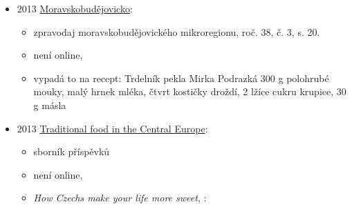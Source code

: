 \begin{itemize}
\begin{itemize}
    \begin{itemize}
    \tightlist
    \item
      s. 204 - obrázek kolíků na přípravu trdelníků a hotovejch
      smaženejch trdelníků z Rebešovic u Brna z roku 1972
    \item
      s. 205 - masopust, všeobecně se pekly koblížky, boží milosti a
      trdelníky, ve Vlčnově připravovali trdláče, pecové vdolky
    \item
      s. 216-217 - popis některejch variant trdelníků:

      \begin{itemize}
      \tightlist
      \item
        Dětkovice u Prostějova těsto se žloutkem, zadělaný smetanou,
        tenkej plát se namotal na váleček a smažil v sádle
      \item
        v Kobylí velký smetanový trubičky s průměrem 5-6 cm, dlouhý
        12-14 cm, namotaný na kolíky z turkyniska, upekly a posypaly
        mletejma ořechama s cukrem. Po druhý světový válce se dovnitř
        dávala i šlehačka
      \end{itemize}
    \end{itemize}
  \end{itemize}
\item
  2013
  \href{https://www.digitalniknihovna.cz/kkvhb/uuid/uuid:3309e674-5344-4805-9b8c-7cddfb004b14}{Moravskobudějovicko}:

  \begin{itemize}
  \tightlist
  \item
    zpravodaj moravskobudějovického mikroregionu, roč. 38, č. 3, s. 20.
  \item
    není online, 
  \item
    vypadá to na recept: Trdelník pekla Mirka Podrazká 300 g polohrubé
    mouky, malý hrnek mléka, čtvrt kostičky droždí, 2 lžíce cukru
    krupice, 30 g másla
  \end{itemize}
\item
  2013
  \href{https://kramerius.lib.cas.cz/uuid/uuid:2d27620d-accd-4efa-b465-d558b0c979a4}{Traditional
  food in the Central Europe}:

  \begin{itemize}
  \tightlist
  \item
    sborník příspěvků
  \item
    není online,
  \item
    \emph{How Czechs make your life more sweet},
     :


\end{itemize}
\end{itemize}
